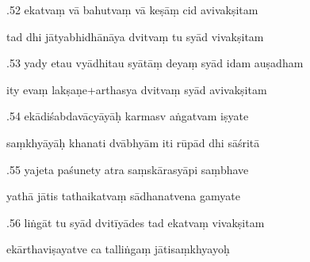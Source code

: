 \documentclass[article,12pt,a4paper]{memoir}%
\newcounter{parCount}
\begin{document}
	  
	  \pstart {}.52 ekatvaṃ vā bahutvaṃ vā keṣāṃ cid avivakṣitam 
	{}
	\pend%
      

	  
	  \pstart \leavevmode%
	tad dhi jātyabhidhānāya dvitvaṃ tu syād vivakṣitam 
	{}
	\pend%
      

	  
	  \pstart {}.53 yady etau vyādhitau syātāṃ deyaṃ syād idam auṣadham 
	{}
	\pend%
      

	  
	  \pstart \leavevmode%
	ity evaṃ lakṣaṇe+arthasya dvitvaṃ syād avivakṣitam 
	{}
	\pend%
      

	  
	  \pstart {}.54 ekādiśabdavācyāyāḥ karmasv aṅgatvam iṣyate 
	{}
	\pend%
      

	  
	  \pstart \leavevmode%
	saṃkhyāyāḥ khanati dvābhyām iti rūpād dhi sāśritā 
	{}
	\pend%
      

	  
	  \pstart {}.55 yajeta paśunety atra saṃskārasyāpi saṃbhave 
	{}
	\pend%
      

	  
	  \pstart \leavevmode%
	yathā jātis tathaikatvaṃ sādhanatvena gamyate 
	{}
	\pend%
      

	  
	  \pstart {}.56 liṅgāt tu syād dvitīyādes tad ekatvaṃ vivakṣitam 
	{}
	\pend%
      

	  
	  \pstart \leavevmode%
	ekārthaviṣayatve ca talliṅgaṃ jātisaṃkhyayoḥ 
	{}
	\pend%
      
\end{document}
